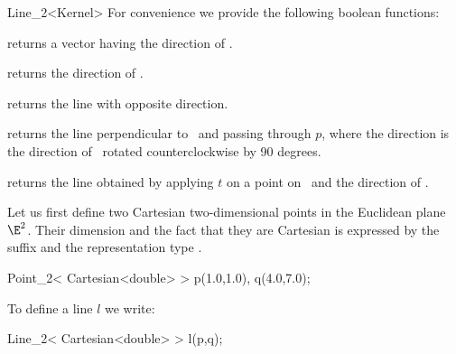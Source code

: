 \begin{ccRefClass} {Line_2<Kernel>}
For convenience we provide the following boolean functions:

       {}
\ccGlue
{}
       {}
\ccGlue
{}
       {}


       {returns a vector having the direction of \ccVar.}

       {returns the direction of \ccVar.}

       {returns the line with opposite direction.}

        {returns the line perpendicular to \ccVar\ and passing through $p$,
         where the direction is the direction of \ccVar\ rotated 
         counterclockwise by 90 degrees.}

       {returns the line obtained by applying $t$ on a point on \ccVar\ 
        and the direction of \ccVar.}



\ccExample
Let us first define two Cartesian two-dimensional points in the Euclidean 
plane $\E^2$. Their
dimension and the fact that they are Cartesian is expressed by
the suffix  and the representation type .

\begin{cprog}

  Point_2< Cartesian<double> >  p(1.0,1.0), q(4.0,7.0);
\end{cprog} 

To define a line $l$ we write:

\begin{cprog}

  Line_2< Cartesian<double> > l(p,q);
\end{cprog} 

\ccSeeAlso
{} \\

\end{ccRefClass} 
